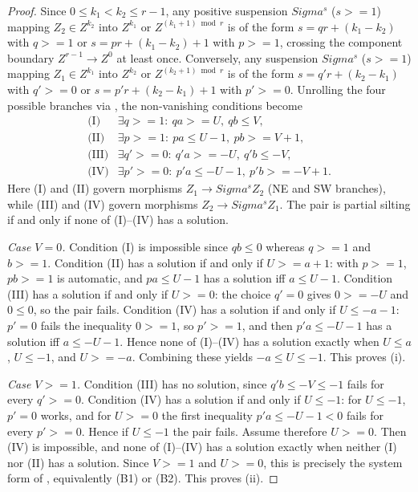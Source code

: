 \documentclass[11pt, a4paper]{article}
\theoremstyle{definition}
\def\Sigma{Sigma}%
\def\ge{>=}%
\def\mathcal#1{#1}%
\begin{document}
\begin{proof}
Since $0 \le k_1 < k_2 \le r-1$, any positive suspension $\Sigma^s$ ($s \ge 1$) mapping $Z_2 \in \mathcal Z^{k_2}$ into $\mathcal Z^{k_1}$ or $\mathcal Z^{(k_1+1)\bmod r}$ is of the form $s = qr + (k_1 - k_2)$ with $q \ge 1$ or $s = pr + (k_1 - k_2) + 1$ with $p \ge 1$, crossing the component boundary $\mathcal Z^{r-1} \to \mathcal Z^0$ at least once. Conversely, any suspension $\Sigma^s$ ($s \ge 1$) mapping $Z_1 \in \mathcal Z^{k_1}$ into $\mathcal Z^{k_2}$ or $\mathcal Z^{(k_2+1)\bmod r}$ is of the form $s = q'r + (k_2 - k_1)$ with $q' \ge 0$ or $s = p'r + (k_2 - k_1) + 1$ with $p' \ge 0$. Unrolling the four possible branches via , the non-vanishing conditions become
\[
\begin{array}{ll}
\text{(I)} & \exists q\ge1:\ qa\ge U,\ qb\le V, \\[2pt]
\text{(II)} & \exists p\ge1:\ pa\le U-1,\ pb\ge V+1, \\[2pt]
\text{(III)} & \exists q'\ge0:\ q'a\ge -U,\ q'b\le -V, \\[2pt]
\text{(IV)} & \exists p'\ge0:\ p'a\le -U-1,\ p'b\ge -V+1.
\end{array}
\]
Here \textup{(I)} and \textup{(II)} govern morphisms $Z_1\to \Sigma^s Z_2$ (NE and SW branches), while \textup{(III)} and \textup{(IV)} govern morphisms $Z_2\to \Sigma^s Z_1$. The pair is partial silting if and only if none of \textup{(I)}--\textup{(IV)} has a solution.

\emph{Case $V=0$.} Condition \textup{(I)} is impossible since $qb\le 0$ whereas $q \ge 1$ and $b \ge 1$. Condition \textup{(II)} has a solution if and only if $U\ge a+1$: with $p\ge1$, $pb\ge1$ is automatic, and $pa\le U-1$ has a solution iff $a\le U-1$. Condition \textup{(III)} has a solution if and only if $U\ge0$: the choice $q'=0$ gives $0\ge -U$ and $0\le 0$, so the pair fails. Condition \textup{(IV)} has a solution if and only if $U\le -a-1$: $p'=0$ fails the inequality $0\ge1$, so $p'\ge1$, and then $p'a\le -U-1$ has a solution iff $a\le -U-1$. Hence none of \textup{(I)}--\textup{(IV)} has a solution exactly when $U\le a$, $U\le-1$, and $U\ge -a$. Combining these yields $-a\le U\le-1$. This proves (i).

\emph{Case $V\ge1$.} Condition \textup{(III)} has no solution, since $q'b\le-V\le-1$ fails for every $q'\ge0$. Condition \textup{(IV)} has a solution if and only if $U\le-1$: for $U\le-1$, $p'=0$ works, and for $U\ge0$ the first inequality $p'a\le-U-1<0$ fails for every $p'\ge0$. Hence if $U\le-1$ the pair fails. Assume therefore $U\ge0$. Then \textup{(IV)} is impossible, and none of \textup{(I)}--\textup{(IV)} has a solution exactly when neither \textup{(I)} nor \textup{(II)} has a solution. Since $V\ge1$ and $U\ge0$, this is precisely the system form of , equivalently \textup{(B1)} or \textup{(B2)}. This proves (ii).


\end{proof}
\end{document}
